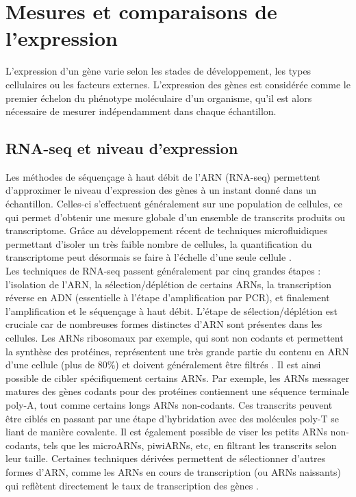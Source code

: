 \section{Mesures et comparaisons de l’expression}
\label{sec:mesure-et-comparaison}

L’expression d’un gène varie selon les stades de développement, les types cellulaires ou les facteurs externes. L’expression des gènes est considérée comme le premier échelon du phénotype moléculaire d’un organisme, qu’il est alors nécessaire de mesurer indépendamment dans chaque échantillon.

\subsection{RNA-seq et niveau d’expression}
\label{subsec:RNAseq-niveau-expression}
Les méthodes de séquençage à haut débit de l’\acrshort{ARN} (\acrshort{RNA-seq}) permettent d’approximer le niveau d’expression des gènes à un instant donné dans un échantillon. Celles-ci s’effectuent généralement sur une population de cellules, ce qui permet d’obtenir une mesure globale d’un ensemble de transcrits produits ou transcriptome. Grâce au développement récent de techniques microfluidiques permettant d’isoler un très faible nombre de cellules, la quantification du transcriptome peut désormais se faire à l’échelle d’une seule cellule \citep{tang_mrna-seq_2009}. 
 \\

Les techniques de \acrshort{RNA-seq} passent généralement par cinq grandes étapes : l’isolation de l’\acrshort{ARN}, la sélection/déplétion de certains \acrshort{ARN}s, la transcription réverse en \acrshort{ADN} (essentielle à l’étape d’amplification par PCR), et finalement l’amplification et le séquençage à haut débit. L’étape de sélection/déplétion est cruciale car de nombreuses formes distinctes d’\acrshort{ARN} sont présentes dans les cellules. Les \acrshort{ARN}s ribosomaux par exemple, qui sont non codants et permettent la synthèse des protéines, représentent une très grande partie du contenu en \acrshort{ARN} d’une cellule (plus de 80\%) et doivent généralement être filtrés \citep{oneil_ribosomal_2013}. Il est ainsi possible de cibler spécifiquement certains \acrshort{ARN}s. Par exemple, les \acrshort{ARN}s messager matures des gènes codants pour des protéines contiennent une séquence terminale poly-A, tout comme certains longs \acrshort{ARN}s non-codants. Ces transcrits peuvent être ciblés en passant par une étape d'hybridation avec des molécules poly-T se liant de manière covalente. Il est également possible de viser les petits \acrshort{ARN}s non-codants, tels que les micro\acrshort{ARN}s, piwi\acrshort{ARN}s, etc, en filtrant les transcrits selon leur taille. Certaines techniques dérivées permettent de sélectionner d’autres formes d’\acrshort{ARN}, comme les \acrshort{ARN}s en cours de transcription (ou \acrshort{ARN}s naissants) qui reflètent directement le taux de transcription des gènes \citep{core_nascent_2008}. 

